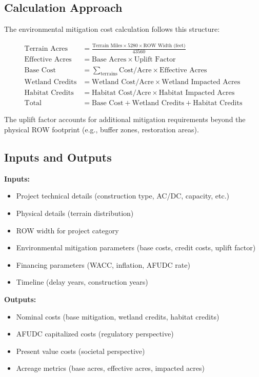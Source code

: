 \documentclass[ctcc_full_documentation.tex]{subfiles}
\begin{document}
\subsection{Calculation Approach}

The environmental mitigation cost calculation follows this structure:

\begin{align}
\text{Terrain Acres} &= \frac{\text{Terrain Miles} \times 5280 \times \text{ROW Width (feet)}}{43560} \\
\text{Effective Acres} &= \text{Base Acres} \times \text{Uplift Factor} \\
\text{Base Cost} &= \sum_{\text{terrains}} \text{Cost/Acre} \times \text{Effective Acres} \\
\text{Wetland Credits} &= \text{Wetland Cost/Acre} \times \text{Wetland Impacted Acres} \\
\text{Habitat Credits} &= \text{Habitat Cost/Acre} \times \text{Habitat Impacted Acres} \\
\text{Total} &= \text{Base Cost} + \text{Wetland Credits} + \text{Habitat Credits}
\end{align}

The uplift factor accounts for additional mitigation requirements beyond the physical ROW footprint (e.g., buffer zones, restoration areas).

\subsection{Inputs and Outputs}

\textbf{Inputs:}
\begin{itemize}
    \item Project technical details (construction type, AC/DC, capacity, etc.)
    \item Physical details (terrain distribution)
    \item ROW width for project category
    \item Environmental mitigation parameters (base costs, credit costs, uplift factor)
    \item Financing parameters (WACC, inflation, AFUDC rate)
    \item Timeline (delay years, construction years)
\end{itemize}

\textbf{Outputs:}
\begin{itemize}
    \item Nominal costs (base mitigation, wetland credits, habitat credits)
    \item AFUDC capitalized costs (regulatory perspective)
    \item Present value costs (societal perspective)
    \item Acreage metrics (base acres, effective acres, impacted acres)
\end{itemize}
\end{document}
